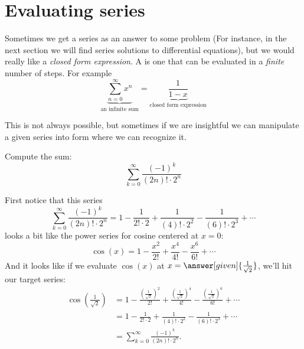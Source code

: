 \documentclass{ximera}
\begin{document}
\section{Evaluating series}

Sometimes we get a series as an answer to some problem (For instance,
in the next section we will find series solutions to differential
equations), but we would really like a \textit{closed form expression}. A 
is one that can be evaluated in a \textit{finite} number of steps. For example
\[
\underbrace{\sum_{n=0}^\infty x^n}_\text{an infinite sum}  = \underbrace{\frac{1}{1-x}}_{\text{closed form expression}}
\]




This is not always possible, but sometimes if we are insightful we can
manipulate a given series into form where we can recognize it.


\begin{example}
  Compute the sum:
  \[
  \sum_{k=0}^\infty \frac{(-1)^k}{(2n)!\cdot 2^n}
  \]
  \begin{explanation}
    First notice that this series
    \[
    \sum_{k=0}^\infty \frac{(-1)^k}{(2n)!\cdot 2^n} = 1 - \frac{1}{2!\cdot 2} + \frac{1}{(4)!\cdot 2^2}-\frac{1}{(6)!\cdot 2^3} + \cdots
    \]
    looks a bit like the power series for cosine centered at $x=0$:
    \[
    \cos(x) = 1-\frac{x^2}{2!} + \frac{x^4}{4!} - \frac{x^6}{6!}+ \cdots
    \]
    And it looks like if we evaluate $\cos(x)$ at $x =
    \answer[given]{\frac{1}{\sqrt{2}}}$, we'll hit our target series:
    \begin{align*}
      \cos\left(\frac{1}{\sqrt{2}}\right) &=1-\frac{\left(\frac{1}{\sqrt{2}}\right)^2}{2!} + \frac{\left(\frac{1}{\sqrt{2}}\right)^4}{4!} - \frac{\left(\frac{1}{\sqrt{2}}\right)^6}{6!}+ \cdots\\
      &= 1 - \frac{1}{2!\cdot 2} + \frac{1}{(4)!\cdot 2^2}-\frac{1}{(6)!\cdot 2^3} + \cdots\\
      &=\sum_{k=0}^\infty \frac{(-1)^k}{(2n)!\cdot 2^n}.
    \end{align*}
  \end{explanation}
\end{example}
\end{document}
